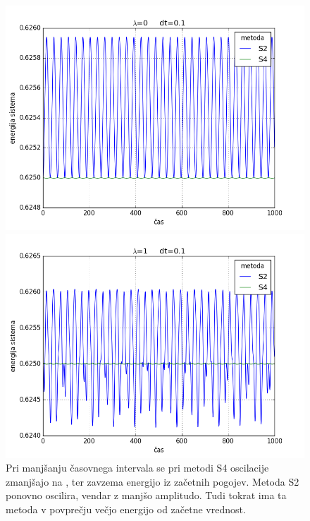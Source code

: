 \documentclass[slovene,11pt,a4paper]{article}
\numberwithin{equation}{section} %
\numberwithin{figure}{section} %
\numberwithin{table}{section} %
\begin{document}
\begin{figure}[!ht]
\centering
\begin{minipage}{0.5\textwidth}
\centering
\includegraphics[scale=0.45]{slike/energija_1_1.png}
\end{minipage}\hfill
\begin{minipage}{0.5\textwidth}
\centering
\includegraphics[scale=0.45]{slike/energija_1_2.png}
\end{minipage}
\caption{Pri manjšanju časovnega intervala se pri metodi S4 oscilacije zmanjšajo na , ter zavzema energijo iz začetnih pogojev. Metoda S2 ponovno oscilira, vendar z manjšo amplitudo. Tudi tokrat ima ta metoda v povprečju večjo energijo od začetne vrednost.}
\end{figure}
\end{document}
